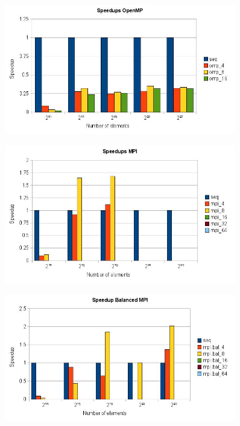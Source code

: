 \begin{frame}
	\begin{figure}[!htp]
		\begin{center}
			\includegraphics[width=0.9\textwidth]{images/speedup_omp}
		\end{center}
	\end{figure}
\end{frame}

\begin{frame}
	\begin{figure}[!htp]
		\begin{center}
			\includegraphics[width=0.9\textwidth]{images/speedup_mpi}
		\end{center}
	\end{figure}
\end{frame}

\begin{frame}
	\begin{figure}[!htp]
		\begin{center}
			\includegraphics[width=0.9\textwidth]{images/speedup_mpi_bal}
		\end{center}
	\end{figure}
\end{frame}
